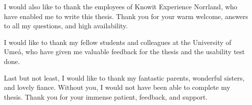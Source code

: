I would also like to thank the employees of Knowit Experience Norrland, who have enabled me to write this thesis. Thank you for your warm welcome, answers to all my questions, and high availability.

I would like to thank my fellow students and colleagues at the University of Umeå, who have given me valuable feedback for the thesis and the usability test done.  

Last but not least, I would like to thank my fantastic parents, wonderful sisters, and lovely fiance. Without you, I would not have been able to complete my thesis. Thank you for your immense patient, feedback, and support.
\newpage
{}
